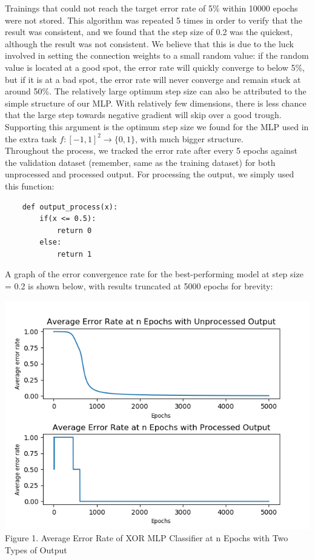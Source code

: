 \documentclass[a4paper]{article}
\begin{document}
Trainings that could not reach the target error rate of 5\% within 10000 epochs were not stored. This algorithm was repeated 5 times in order to verify that the result was consistent, and we found that the step size of 0.2 was the quickest, although the result was not consistent. We believe that this is due to the luck involved in setting the connection weights to a small random value: if the random value is located at a good spot, the error rate will quickly converge to below 5\%, but if it is at a bad spot, the error rate will never converge and remain stuck at around 50\%. The relatively large optimum step size can also be attributed to the simple structure of our MLP. With relatively few dimensions, there is less chance that the large step towards negative gradient will skip over a good trough. Supporting this argument is the optimum step size we found for the MLP used in the extra task $f:[-1,1]^2 \rightarrow \{0,1\}$, with much bigger structure. \\
Throughout the process, we tracked the error rate after every 5 epochs against the validation dataset (remember, same as the training dataset) for both unprocessed and processed output. For processing the output, we simply used this function:
\begin{lstlisting}
	def output_process(x):
		if(x <= 0.5):
			return 0
		else:
			return 1
\end{lstlisting}
A graph of the error convergence rate for the best-performing model at step size = 0.2 is shown below, with results truncated at 5000 epochs for brevity: 
\begin{center}
	\includegraphics[scale=0.4]{res.png}\\
	Figure 1. Average Error Rate of XOR MLP Classifier at n Epochs with Two Types of Output \\
\end{center}
\end{document}
